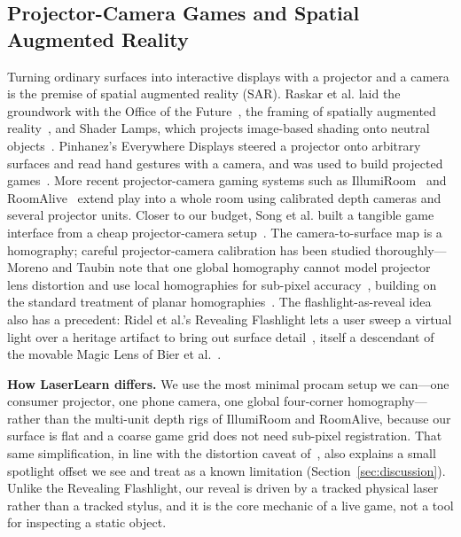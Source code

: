 \documentclass[conference]{IEEEtran}
\begin{document}
\subsection{Projector-Camera Games and Spatial Augmented Reality}
Turning ordinary surfaces into interactive displays with a projector and a camera
is the premise of spatial augmented reality (SAR). Raskar et al. laid the
groundwork with the Office of the Future~\cite{raskar1998office}, the framing of
spatially augmented reality~\cite{raskar1998sar}, and Shader Lamps, which projects
image-based shading onto neutral objects~\cite{raskar2001shaderlamps}. Pinhanez's
Everywhere Displays steered a projector onto arbitrary surfaces and read hand
gestures with a camera, and was used to build projected games~\cite{pinhanez2001}.
More recent projector-camera gaming systems such as
IllumiRoom~\cite{jones2013illumiroom} and RoomAlive~\cite{jones2014roomalive}
extend play into a whole room using calibrated depth cameras and several projector
units. Closer to our budget, Song et al. built a tangible game interface from a
cheap projector-camera setup~\cite{song2007tangible}. The camera-to-surface map is
a homography; careful projector-camera calibration has been studied
thoroughly---Moreno and Taubin note that one global homography cannot model
projector lens distortion and use local homographies for sub-pixel
accuracy~\cite{moreno2012}, building on the standard treatment of planar
homographies~\cite{hartley2004}. The flashlight-as-reveal idea also has a
precedent: Ridel et al.'s Revealing Flashlight lets a user sweep a virtual light
over a heritage artifact to bring out surface detail~\cite{ridel2014}, itself a
descendant of the movable Magic Lens of Bier et al.~\cite{bier1993}.

\textbf{How LaserLearn differs.} We use the most minimal procam setup we
can---one consumer projector, one phone camera, one global four-corner
homography---rather than the multi-unit depth rigs of IllumiRoom and RoomAlive,
because our surface is flat and a coarse game grid does not need sub-pixel
registration. That same simplification, in line with the distortion caveat
of~\cite{moreno2012}, also explains a small spotlight offset we see and treat as a
known limitation (Section~\ref{sec:discussion}). Unlike the Revealing Flashlight,
our reveal is driven by a tracked physical laser rather than a tracked stylus, and
it is the core mechanic of a live game, not a tool for inspecting a static object.
\end{document}
